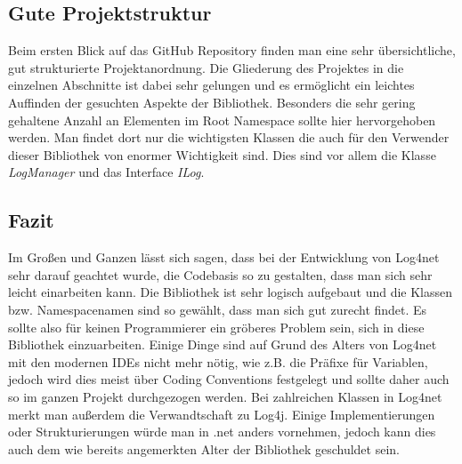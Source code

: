 \subsection{Gute Projektstruktur}
Beim ersten Blick auf das GitHub Repository finden man eine sehr übersichtliche, gut strukturierte Projektanordnung. Die Gliederung des Projektes in die einzelnen Abschnitte ist dabei sehr gelungen und es ermöglicht ein leichtes Auffinden der gesuchten Aspekte der Bibliothek. Besonders die sehr gering gehaltene Anzahl an Elementen im Root Namespace sollte hier hervorgehoben werden. Man findet dort nur die wichtigsten Klassen die auch für den Verwender dieser Bibliothek von enormer Wichtigkeit sind. Dies sind vor allem die Klasse \textit{LogManager} und das Interface \textit{ILog}.

\subsection{Fazit}
Im Großen und Ganzen lässt sich sagen, dass bei der Entwicklung von Log4net sehr darauf geachtet wurde, die Codebasis so zu gestalten, dass man sich sehr leicht einarbeiten kann. Die Bibliothek ist sehr logisch aufgebaut und die Klassen bzw. Namespacenamen sind so gewählt, dass man sich gut zurecht findet. Es sollte also für keinen Programmierer ein gröberes Problem sein, sich in diese Bibliothek einzuarbeiten. Einige Dinge sind auf Grund des Alters von Log4net mit den modernen IDEs nicht mehr nötig, wie z.B. die Präfixe für Variablen, jedoch wird dies meist über Coding Conventions festgelegt und sollte daher auch so im ganzen Projekt durchgezogen werden. Bei zahlreichen Klassen in Log4net merkt man außerdem die Verwandtschaft zu Log4j. Einige Implementierungen oder Strukturierungen würde man in .net anders vornehmen, jedoch kann dies auch dem wie bereits angemerkten Alter der Bibliothek geschuldet sein.